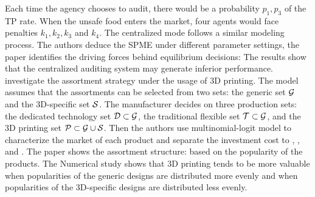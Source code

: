 \documentclass[12pt]{report}
\begin{document}
Each time the agency chooses to audit, there would be a probability $p_1,p_3$ of the TP rate. When the unsafe food enters the market, four agents would face penalties $k_1,k_2,k_3$ and $k_4$.
The centralized mode follows a similar modeling process. The authors deduce the SPME under different parameter settings,
the paper identifies the driving forces behind equilibrium decisions:
The results show that the centralized auditing system may generate inferior performance.\\
\cite{dong20223d} investigate the assortment strategy under the usage of 3D printing. The model assumes that the assortments can be selected from two sets:
the generic set $\mathcal{G}$ and the 3D-specific set $\mathcal{S}$. The manufacturer decides on three production sets: the dedicated
technology set $\mathcal{D}\subset\mathcal{G}$, the traditional flexible set $\mathcal{T} \subset \mathcal{G}$, and the 3D printing set $\mathcal{P} \subset \mathcal{G}\cup\mathcal{S}$.
Then the authors use multinomial-logit model to characterize the market of each product and separate the investment cost to , , and .
The paper shows the assortment structure: based on the popularity of the products. The Numerical study shows that 3D printing tends to be more valuable when popularities of the generic designs are distributed
more evenly and when popularities of the 3D-specific designs are distributed less evenly.
\end{document}
